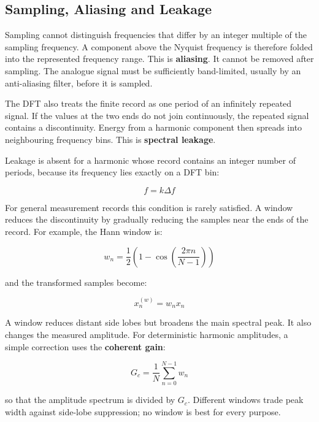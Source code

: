 \subsection{Sampling, Aliasing and Leakage}

Sampling cannot distinguish frequencies that differ by an integer multiple of
the sampling frequency. A component above the Nyquist frequency is therefore
folded into the represented frequency range. This is \textbf{aliasing}. It
cannot be removed after sampling. The analogue signal must be sufficiently
band-limited, usually by an anti-aliasing filter, before it is sampled.

The DFT also treats the finite record as one period of an infinitely repeated
signal. If the values at the two ends do not join continuously, the repeated
signal contains a discontinuity. Energy from a harmonic component then spreads
into neighbouring frequency bins. This is \textbf{spectral leakage}.

Leakage is absent for a harmonic whose record contains an integer number of
periods, because its frequency lies exactly on a DFT bin:

\begin{equation}
    f = k\Delta f
\end{equation}

For general measurement records this condition is rarely satisfied. A window
reduces the discontinuity by gradually reducing the samples near the ends of
the record. For example, the Hann window is:

\begin{equation}
    w_n = \frac{1}{2}\left(1-\cos\left(\frac{2\pi n}{N-1}\right)\right)
\end{equation}

and the transformed samples become:

\begin{equation}
    x_n^{(w)} = w_n x_n
\end{equation}

A window reduces distant side lobes but broadens the main spectral peak. It
also changes the measured amplitude. For deterministic harmonic amplitudes, a
simple correction uses the \textbf{coherent gain}:

\begin{equation}
    G_c = \frac{1}{N}\sum_{n=0}^{N-1}w_n
\end{equation}

so that the amplitude spectrum is divided by $ G_c $. Different windows trade
peak width against side-lobe suppression; no window is best for every purpose.

